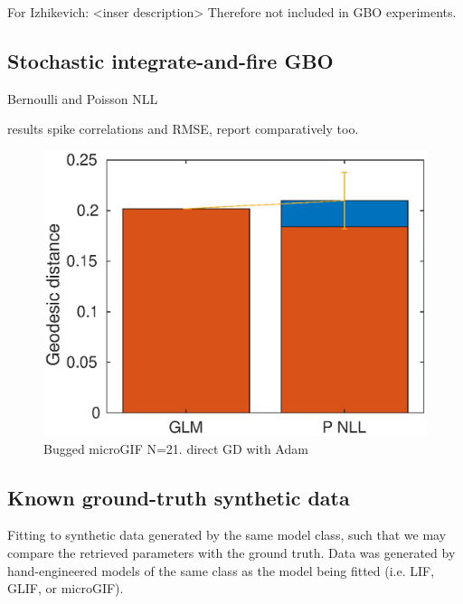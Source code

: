 \documentclass[mphil,deptreport,ianc]{infthesis} %
\begin{document}
For Izhikevich: <inser description>
Therefore not included in GBO experiments.


\subsection{Stochastic integrate-and-fire GBO}

Bernoulli and Poisson NLL

results spike correlations and RMSE, report comparatively too.

\begin{figure}
    \centering
    \includegraphics[width=0.9\columnwidth]{figures/matlab/bugged_microGIF_21.eps}
    \caption{Bugged microGIF N=21. direct GD with Adam}
\end{figure}

\subsection{Known ground-truth synthetic data}
Fitting to synthetic data generated by the same model class, such that we may compare the retrieved parameters with the ground truth.
Data was generated by hand-engineered models of the same class as the model being fitted (i.e. LIF, GLIF, or microGIF).
\end{document}
